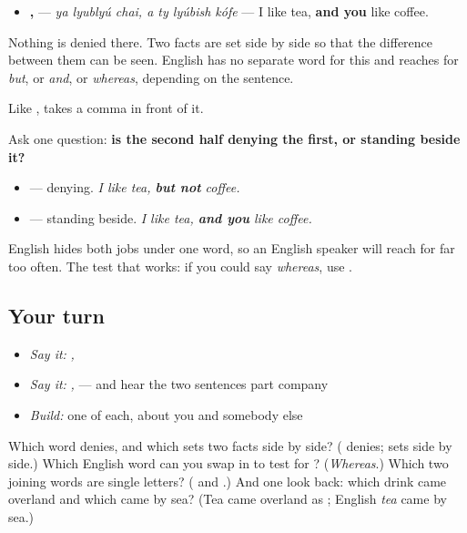 \begin{itemize}
\raggedright
  \item \textbf{  ,    } — \emph{ya lyublyú chai, a ty lyúbish kófe} — I like tea, \textbf{and you} like coffee.
\end{itemize}

Nothing is denied there. Two facts are set side by side so that the difference between them can be seen. English has no separate word for this and reaches for \emph{but}, or \emph{and}, or \emph{whereas}, depending on the sentence.

Like \textbf{}, \textbf{} takes a comma in front of it.

\begin{grammarlens}[title={Grammar lens — which of the two to reach for}]
Ask one question: \textbf{is the second half denying the first, or standing beside it?}

\begin{itemize}
\raggedright
  \item \textbf{} — denying. \emph{I like tea, \textbf{but not} coffee.}
  \item \textbf{} — standing beside. \emph{I like tea, \textbf{and you} like coffee.}
\end{itemize}

English hides both jobs under one word, so an English speaker will reach for \textbf{} far too often. The test that works: if you could say \emph{whereas}, use \textbf{}.
\end{grammarlens}

\subsection*{Your turn}
\begin{itemize}
\raggedright
  \item \emph{Say it:} \emph{  ,    }
  \item \emph{Say it:} \emph{  ,   } — and hear the two sentences part company
  \item \emph{Build:} one of each, about you and somebody else
\end{itemize}

\begin{tcolorbox}[breakable,colback=teal!4,colframe=teal!35!black,title={Before you move on}]
Which word denies, and which sets two facts side by side? (\textbf{} denies; \textbf{} sets side by side.) Which English word can you swap in to test for \textbf{}? (\emph{Whereas}.) Which two joining words are single letters? (\textbf{} and \textbf{}.) And one look back: which drink came overland and which came by sea? (Tea came overland as \textbf{}; English \emph{tea} came by sea.)
\end{tcolorbox}
